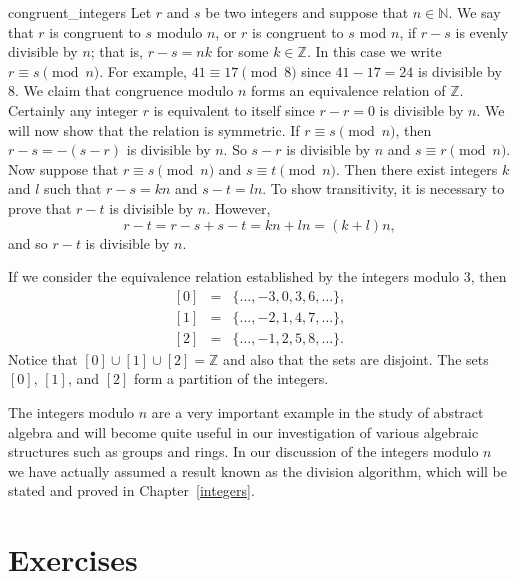\begin{example}{congruent_integers}
Let $r$ and $s$ be two integers and suppose that $n \in {\mathbb N}$.  We say that $r$ is {\bfi congruent to $s$ \bfi modulo} $n$, or $r$ is {\bfi congruent to $s$ \bfi mod} $n$, if $r - s$ is evenly divisible by $n$; that is, $r - s = nk$  for some $k \in {\mathbb Z}$.  In this case we write $r \equiv s \pmod{n}$\label{sets_a_mod_b}.  For example, \mbox{$41 \equiv 17 \pmod{ 8}$} since $41 - 17=24$ is divisible by 8.  We claim that congruence modulo $n$ forms an equivalence relation of ${\mathbb Z}$.  Certainly any integer $r$ is equivalent to itself since $r - r = 0$ is divisible by $n$.  We will now show that the relation is symmetric.  If $r \equiv s \pmod{ n}$, then $r - s = -(s -r)$ is divisible by $n$. So $s - r$ is divisible by $n$ and $s \equiv r \pmod{ n}$.  Now suppose that $r \equiv s \pmod{ n}$ and $s \equiv t \pmod{ n}$.  Then there exist integers $k$ and $l$ such that $r -s = kn$ and $s - t = ln$.  To show transitivity, it is necessary to prove that $r - t$ is divisible by $n$.  However,   
$$
r - t = r - s + s - t = kn + ln = (k + l)n,
$$
and so $r - t$ is divisible by $n$.
 
 
If we consider the equivalence relation established by the integers modulo 3, then 
\begin{eqnarray*}
{[0]} & = & \{ \ldots, -3, 0, 3, 6, \ldots \}, \\
{[1]} & = & \{ \ldots, -2, 1, 4, 7, \ldots \}, \\
{[2]} & = & \{ \ldots, -1, 2, 5, 8, \ldots \}.
\end{eqnarray*}
Notice that $[0] \cup [1] \cup [2] = {\mathbb Z}$ and also that the sets are disjoint.  The sets $[0]$, $[1]$, and $[2]$ form a partition of the integers. 

The integers modulo $n$ are a very important example in the study of abstract algebra and will become quite useful in our investigation of various algebraic structures such as groups and rings.  In our discussion of the integers modulo $n$ we have actually assumed a result known as the division algorithm, which will be stated and proved in Chapter~\ref{integers}.
\end{example}

 
\section*{Exercises}
\exrule
 
